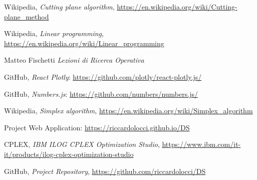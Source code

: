 \documentclass[9pt]{extarticle}
\begin{document}
    \begin{thebibliography}{7}

        Wikipedia,
        \textit{Cutting plane algorithm},
        \url{https://en.wikipedia.org/wiki/Cutting-plane_method}

        Wikipedia,
        \textit{Linear programming},
        \url{https://en.wikipedia.org/wiki/Linear_programming}

        Matteo Fischetti
        \textit{ Lezioni di Ricerca Operativa }

        GitHub,
        \textit{React Plotly}:
        \url{https://github.com/plotly/react-plotly.js/}

        GitHub,
        \textit{Numbers.js}:
        \url{https://github.com/numbers/numbers.js/}

        Wikipedia,
        \textit{Simplex algorithm},
        \url{https://en.wikipedia.org/wiki/Simplex_algorithm}

        Project Web Application: 
        \url{https://riccardolocci.github.io/DS}
        
        CPLEX,
        \textit{IBM ILOG CPLEX Optimization Studio},
        \url{https://www.ibm.com/it-it/products/ilog-cplex-optimization-studio}

        GitHub,
        \textit{Project Repository},
        \url{https://github.com/riccardolocci/DS}

    \end{thebibliography}
\end{document}
